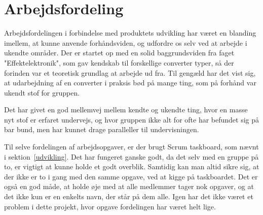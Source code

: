 \chapter{Arbejdsfordeling}
Arbejdsfordelingen i forbindelse med produktets udvikling har været en blanding imellem, at kunne anvende forhåndsviden, og udfordre os selv ved at arbejde i ukendte områder. Der er startet op med en solid baggrundsviden fra faget "Effektelektronik", som gav kendskab til forskellige converter typer, så der forinden var et teoretisk grundlag at arbejde ud fra. Til gengæld har det vist sig, at udarbejdning af en converter i praksis bød på mange ting, som på forhånd var ukendt stof for gruppen.  

Det har givet en god mellemvej mellem kendte og ukendte ting, hvor en masse nyt stof er erfaret undervejs, og hvor gruppen ikke alt for ofte har befundet sig på bar bund, men har kunnet drage paralleller til undervisningen.

Til selve fordelingen af arbejdsopgaver, er der brugt Scrum taskboard, som nævnt i sektion~\ref{udvikling}. Det har fungeret ganske godt, da det selv med en gruppe på to, er vigtigt at kunne holde et godt overblik. Samtidig kan man altid sikre sig, at der ikke er to i gang med den samme opgave, ved at kigge på taskboardet. Det er også en god måde, at holde øje med at alle medlemmer tager nok opgaver, og at det ikke kun er en enkelts navn, der står på dem alle. Igen har det ikke været et problem i dette projekt, hvor opgave fordelingen har været helt lige.     